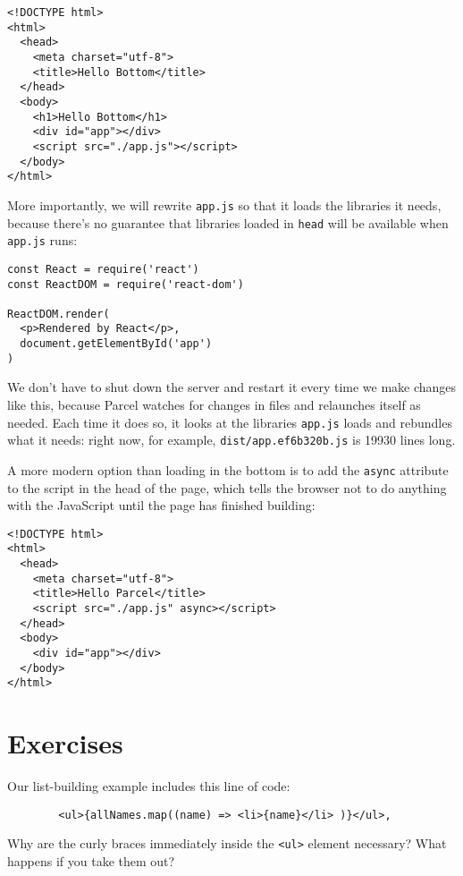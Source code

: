 \begin{verbatim}
<!DOCTYPE html>
<html>
  <head>
    <meta charset="utf-8">
    <title>Hello Bottom</title>
  </head>
  <body>
    <h1>Hello Bottom</h1>
    <div id="app"></div>
    <script src="./app.js"></script>
  </body>
</html>
\end{verbatim}

More importantly,
we will rewrite \texttt{app.js} so that it loads the libraries it needs,
because there's no guarantee that libraries loaded in \texttt{head} will be available when \texttt{app.js} runs:

\begin{verbatim}
const React = require('react')
const ReactDOM = require('react-dom')

ReactDOM.render(
  <p>Rendered by React</p>,
  document.getElementById('app')
)
\end{verbatim}

We don't have to shut down the server and restart it every time we make changes like this,
because Parcel watches for changes in files and relaunches itself as needed.
Each time it does so,
it looks at the libraries \texttt{app.js} loads and rebundles what it needs:
right now,
for example,
\texttt{dist/app.ef6b320b.js} is 19930 lines long.

A more modern option than loading in the bottom is to add the \texttt{async} attribute to the script in the head of the page,
which tells the browser not to do anything with the JavaScript until the page has finished building:

\begin{verbatim}
<!DOCTYPE html>
<html>
  <head>
    <meta charset="utf-8">
    <title>Hello Parcel</title>
    <script src="./app.js" async></script>
  </head>
  <body>
    <div id="app"></div>
  </body>
</html>
\end{verbatim}

\section{Exercises}\label{s:dynamic-exercises}


Our list-building example includes this line of code:

\begin{verbatim}
        <ul>{allNames.map((name) => <li>{name}</li> )}</ul>,
\end{verbatim}

Why are the curly braces immediately inside the \texttt{{\textless}ul{\textgreater}{}} element necessary?
What happens if you take them out?

